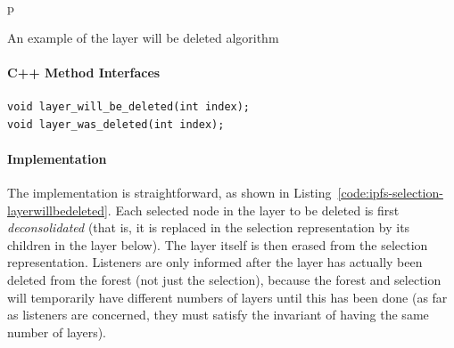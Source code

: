\begin{stusubfig}{p}
	\hspace{4mm}%
\caption{An example of the layer will be deleted algorithm}
\label{fig:ipfs-selection-layerwillbedeleted}
\end{stusubfig}

\paragraph{C++ Method Interfaces}

\begin{lstlisting}[style=Prototype]
void layer_will_be_deleted(int index);
void layer_was_deleted(int index);
\end{lstlisting}

\paragraph{Implementation}

The implementation is straightforward, as shown in Listing~\ref{code:ipfs-selection-layerwillbedeleted}. Each selected node in the layer to be deleted is first \emph{deconsolidated} (that is, it is replaced in the selection representation by its children in the layer below). The layer itself is then erased from the selection representation. Listeners are only informed after the layer has actually been deleted from the forest (not just the selection), because the forest and selection will temporarily have different numbers of layers until this has been done (as far as listeners are concerned, they must satisfy the invariant of having the same number of layers).

